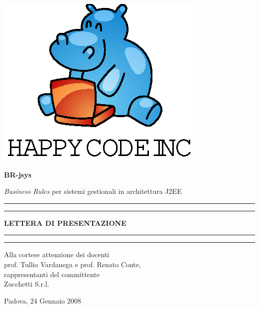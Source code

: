 \documentclass[11pt,titlepage,a4paper]{report}
\begin{document}
\begin{titlepage}
\begin{center}
\vspace*{0.5in}
\includegraphics{logo.eps}
\vspace*{0.2in}

{\Large \textbf{BR-jsys}}

{\Large \emph{Business Rules} per sistemi gestionali in architettura J2EE } 
\vspace{1.3in}
\par\rule{10cm}{.4pt} \par
\par\rule{12cm}{1pt} \par
\vspace*{0.5in}
\LARGE \textbf {LETTERA DI PRESENTAZIONE}
\vspace*{0.5in}
\par\rule{12cm}{1pt} \par
\par\rule{10cm}{.4pt} \par

\end{center}
\end{titlepage}
\vspace*{0.5in}

\thispagestyle{plain}
\begin{flushright}
Alla cortese attenzione dei docenti\\
prof. Tullio Vardanega e prof. Renato Conte,\\
rappresentanti del committente\\
Zucchetti S.r.l.
\end{flushright}
Padova, 24 Gennaio 2008\\
\end{document}
